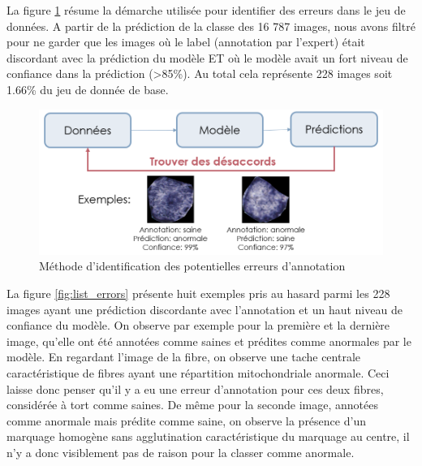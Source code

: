 La figure \ref{fig:identify_errors} résume la démarche utilisée pour identifier des erreurs dans le jeu de données. A partir de la prédiction de la classe des 16 787 images, nous avons filtré pour ne garder que les images où le label (annotation par l'expert) était discordant avec la prédiction du modèle ET où le modèle avait un fort niveau de confiance dans la prédiction (>85\%). Au total cela représente 228 images soit 1.66\% du jeu de donnée de base.
\begin{figure}[htbp]
 \centering
 \includegraphics[width=1\textwidth]{figures/identify_errors.png}
 \caption[Méthode d'identification des potentielles erreurs d'annotation]{Méthode d'identification des potentielles erreurs d'annotation}
 \label{fig:identify_errors}
\end{figure}

La figure \ref{fig:list_errors} présente huit exemples pris au hasard parmi les 228 images ayant une prédiction discordante avec l'annotation et un haut niveau de confiance du modèle. On observe par exemple pour la première et la dernière image, qu'elle ont été annotées comme saines et prédites comme anormales par le modèle. En regardant l'image de la fibre, on observe une tache centrale caractéristique de fibres ayant une répartition mitochondriale anormale. Ceci laisse donc penser qu'il y a eu une erreur d'annotation pour ces deux fibres, considérée à tort comme saines. De même pour la seconde image, annotées comme anormale mais prédite comme saine, on observe la présence d'un marquage homogène sans agglutination caractéristique du marquage au centre, il n'y a donc visiblement pas de raison pour la classer comme anormale.

